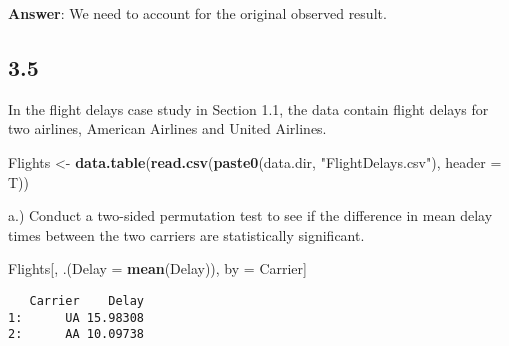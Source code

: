\documentclass[
  12pt,
]{report}
\newenvironment{Shaded}{\begin{snugshade}}{\end{snugshade}}
\newcommand{\DataTypeTok}[1]{\textcolor[rgb]{0.13,0.29,0.53}{#1}}
\newcommand{\KeywordTok}[1]{\textcolor[rgb]{0.13,0.29,0.53}{\textbf{#1}}}
\newcommand{\NormalTok}[1]{#1}
\newcommand{\StringTok}[1]{\textcolor[rgb]{0.31,0.60,0.02}{#1}}
\begin{document}
\textbf{Answer}: We need to account for the original observed result.

\hypertarget{section-4}{%
\subsection{3.5}\label{section-4}}

In the flight delays case study in Section 1.1, the data contain flight
delays for two airlines, American Airlines and United Airlines.

\begin{Shaded}
\begin{Highlighting}[]
\NormalTok{Flights <-}\StringTok{ }\KeywordTok{data.table}\NormalTok{(}\KeywordTok{read.csv}\NormalTok{(}\KeywordTok{paste0}\NormalTok{(data.dir, }\StringTok{"FlightDelays.csv"}\NormalTok{),}
                               \DataTypeTok{header =}\NormalTok{ T))}
\end{Highlighting}
\end{Shaded}

a.) Conduct a two-sided permutation test to see if the difference in
mean delay times between the two carriers are statistically significant.

\begin{Shaded}
\begin{Highlighting}[]
\NormalTok{Flights[, .(}\DataTypeTok{Delay =} \KeywordTok{mean}\NormalTok{(Delay)), by =}\StringTok{ }\NormalTok{Carrier]}
\end{Highlighting}
\end{Shaded}

\begin{verbatim}
   Carrier    Delay
1:      UA 15.98308
2:      AA 10.09738
\end{verbatim}
\end{document}
